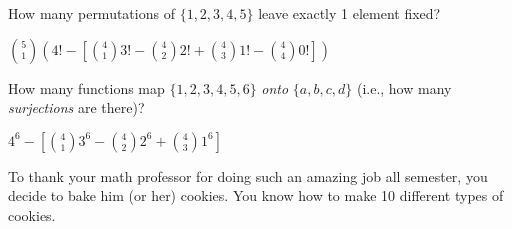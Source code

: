 \begin{questions}
	\begin{answer}
	\end{answer}
	
	


\question How many permutations of $\{1,2,3,4,5\}$ leave exactly 1 element fixed?

	\begin{answer}
		 ${5 \choose 1}\left( 4! - \left[{4 \choose 1}3! - {4 \choose 2}2! + {4 \choose 3} 1! - {4 \choose 4} 0!\right] \right)$
	\end{answer}
	
	


\question How many functions map $\{1,2,3,4,5,6\}$ {\em onto} $\{a,b,c,d\}$ (i.e., how many {\em surjections} are there)?

	\begin{answer}
		$4^6 - \left[{4 \choose 1}3^6 - {4 \choose 2}2^6 + {4 \choose 3} 1^6 \right]$
	\end{answer}
	



\question To thank your math professor for doing such an amazing job all semester, you decide to bake him (or her) cookies.  You know how to make 10 different types of cookies.
\end{questions}
